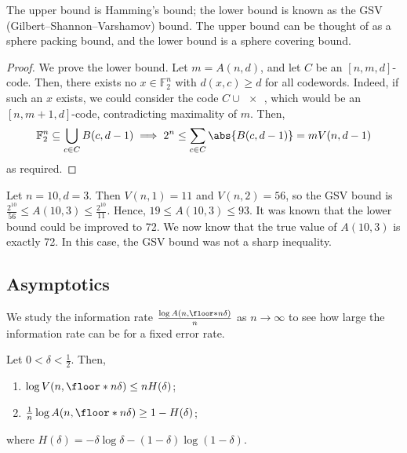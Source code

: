 The upper bound is Hamming's bound; the lower bound is known as the GSV (Gilbert--Shannon--Varshamov) bound.
The upper bound can be thought of as a sphere packing bound, and the lower bound is a sphere covering bound.

\begin{proof}
    We prove the lower bound.
    Let $m = A(n,d)$, and let $C$ be an $[n,m,d]$-code.
    Then, there exists no $x \in \mathbb F_2^n$ with $d(x,c) \geq d$ for all codewords.
    Indeed, if such an $x$ exists, we could consider the code $C \cup \qty{x}$, which would be an $[n,m+1,d]$-code, contradicting maximality of $m$.
    Then,
    \begin{align*}
        \mathbb F_2^n \subseteq \bigcup_{c \in C} B(c,d-1) \implies 2^n \leq \sum_{c \in C} \abs{B(c,d-1)} = mV(n,d-1)
    \end{align*}
    as required.
\end{proof}

\begin{example}
    Let $n = 10, d = 3$.
    Then $V(n,1) = 11$ and $V(n,2) = 56$, so the GSV bound is $\frac{2^{10}}{56} \leq A(10,3) \leq \frac{2^{10}}{11}$.
    Hence, $19 \leq A(10,3) \leq 93$.
    It was known that the lower bound could be improved to 72.
    We now know that the true value of $A(10,3)$ is exactly 72.
    In this case, the GSV bound was not a sharp inequality.
\end{example}

\subsection{Asymptotics}
We study the information rate $\frac{\log A(n,\floor*{n\delta})}{n}$ as $n \to \infty$ to see how large the information rate can be for a fixed error rate.
\begin{proposition}
    Let $0 < \delta < \frac{1}{2}$.
    Then,
    \begin{enumerate}
        \item $\log V(n,\floor*{n\delta}) \leq nH(\delta)$;
        \item $\frac{1}{n} \log A(n,\floor*{n\delta}) \geq 1 - H(\delta)$;
    \end{enumerate}
    where $H(\delta) = -\delta \log \delta - (1-\delta)\log (1-\delta)$.
\end{proposition}

